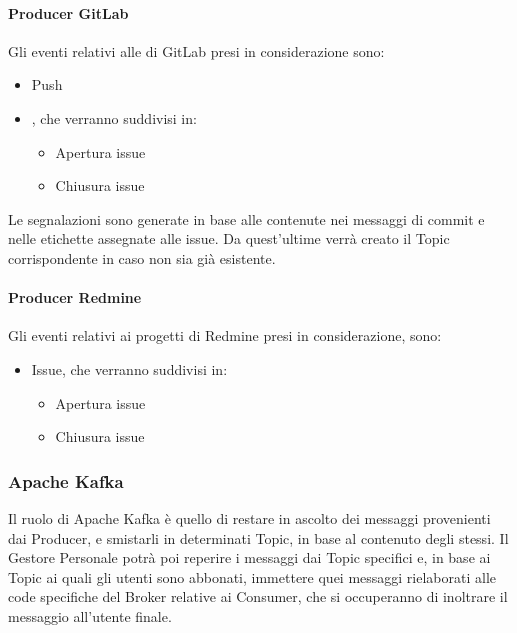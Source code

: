 		\paragraph{Producer GitLab}
		Gli eventi relativi alle  di GitLab presi in considerazione sono:
		\begin{itemize}
			\item Push
			\item {}, che verranno suddivisi in:
			\begin{itemize}
				\item Apertura issue
				\item Chiusura issue
			\end{itemize}
		\end{itemize}
		Le segnalazioni sono generate in base alle  contenute nei messaggi di commit e nelle etichette assegnate alle issue.
		Da quest'ultime verrà creato il Topic corrispondente in caso non sia già esistente.

		\paragraph{Producer Redmine}
		Gli eventi relativi ai progetti di Redmine presi in considerazione, sono:
		\begin{itemize}
			\item Issue, che verranno suddivisi in:
			\begin{itemize}
				\item Apertura issue
				\item Chiusura issue
			\end{itemize}
		\end{itemize}


		
	\subsubsection{Apache Kafka}\label{TecnologieBroker}
	Il ruolo di Apache Kafka è quello di restare in ascolto dei messaggi provenienti dai
	Producer, e smistarli in determinati Topic, in base al contenuto degli stessi.
	Il Gestore Personale potrà poi reperire i messaggi dai Topic specifici e,
	in base ai Topic ai quali gli utenti sono abbonati, immettere quei messaggi rielaborati alle code specifiche del Broker relative ai Consumer, che si occuperanno di
	inoltrare il messaggio all'utente finale.

